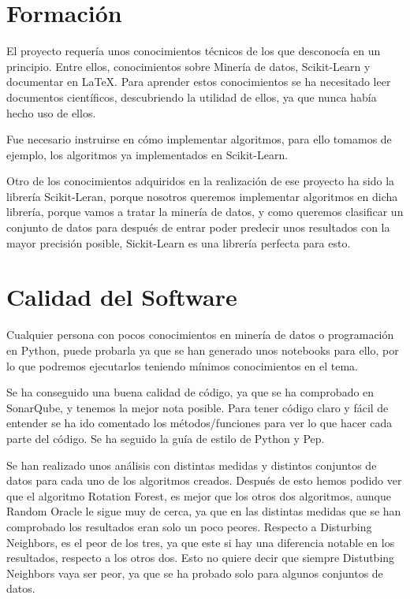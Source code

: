 
\section{Formación}
El proyecto requería unos conocimientos técnicos de los que desconocía en un principio. Entre ellos, conocimientos sobre Minería de datos, Scikit-Learn y documentar en \LaTeX. Para aprender estos conocimientos se ha necesitado leer documentos científicos, descubriendo la utilidad de ellos, ya que nunca había hecho uso de ellos.

Fue necesario instruirse en cómo implementar algoritmos, para ello tomamos de ejemplo, los algoritmos ya implementados en Scikit-Learn.

Otro de los conocimientos adquiridos en la realización de ese proyecto ha sido la librería Scikit-Leran, porque nosotros queremos implementar algoritmos en dicha librería, porque vamos a tratar la minería de datos, y como queremos clasificar un conjunto de datos para después de entrar poder predecir unos resultados con la mayor precisión posible, Sickit-Learn es una librería perfecta para esto. 

\section{Calidad del Software}
Cualquier persona con pocos conocimientos en minería de datos o programación en Python, puede probarla ya que se han generado unos notebooks para ello, por lo que podremos ejecutarlos teniendo mínimos conocimientos en el tema.

Se ha conseguido una buena calidad de código, ya que se ha comprobado en SonarQube, y tenemos la mejor nota posible. Para tener código claro y fácil de entender se ha ido comentado los métodos/funciones para ver lo que hacer cada parte del código. Se ha seguido la guía de estilo de Python y Pep.

Se han realizado unos análisis con distintas medidas y distintos conjuntos de datos para cada uno de los algoritmos creados. Después de esto hemos podido ver que el algoritmo Rotation Forest, es mejor que los otros dos algoritmos, aunque Random Oracle le sigue muy de cerca, ya que en las distintas medidas que se han comprobado los resultados eran solo un poco peores. Respecto a Disturbing Neighbors, es el peor de los tres, ya que este si hay una diferencia notable en los resultados, respecto a los otros dos. Esto no quiere decir que siempre Distutbing Neighbors vaya ser peor, ya que se ha probado solo para algunos conjuntos de datos.
